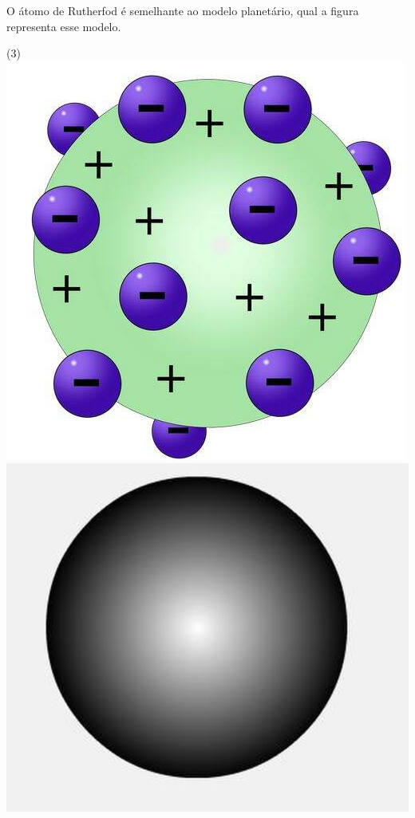 \documentclass[12pt]{scrartcl}
\begin{document}
\begin{exercise}
O átomo de Rutherfod é semelhante ao modelo planetário, qual a figura representa esse modelo.

\begin{choice}(3)
\choice \includegraphics[scale=.6]{Adaptadas/thomson.jpg}
\choice \includegraphics[scale=.1]{Adaptadas/bilhar.png}

\end{choice}
\end{exercise}
\end{document}
